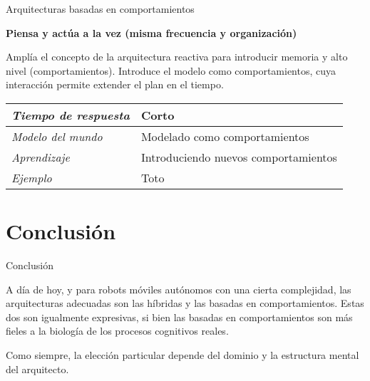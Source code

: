 \documentclass{beamer}
\begin{document}
\begin{frame}{Arquitecturas basadas en comportamientos}

\textbf{Piensa y actúa a la vez (misma frecuencia y organización)}

Amplía el concepto de la arquitectura reactiva para introducir memoria y alto nivel (comportamientos). Introduce el modelo como comportamientos, cuya interacción permite extender el plan en el tiempo.

\begin{tabular}{ l | l }
\emph{Tiempo de respuesta} & Corto \\ \hline
\emph{Modelo del mundo} & Modelado como comportamientos \\ \hline
\emph{Aprendizaje} &  Introduciendo nuevos comportamientos \\ \hline
\emph{Ejemplo} & Toto
\end{tabular}

\end{frame}

\section{Conclusión}

\begin{frame}{Conclusión}

A día de hoy, y para robots móviles autónomos con una cierta complejidad, las arquitecturas adecuadas son las híbridas y las basadas en comportamientos. Estas dos son igualmente expresivas, si bien las basadas en comportamientos son más fieles a la biología de los procesos cognitivos reales.

Como siempre, la elección particular depende del dominio y la estructura mental del arquitecto.

\end{frame}
\end{document}
